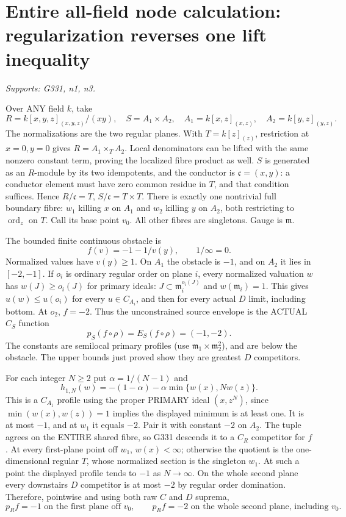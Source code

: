 \documentclass[11pt]{article}
\begin{document}
\section{Entire all-field node calculation: regularization reverses one lift inequality}
\textit{Supports: G331, n1, n3.}

Over ANY field $k$, take
\[
R=k[x,y,z]_{(x,y,z)}/(xy),\quad S=A_1\times A_2,
\quad A_1=k[x,z]_{(x,z)},\quad A_2=k[y,z]_{(y,z)}.
\]
The normalizations are the two regular planes. With $T=k[z]_{(z)}$, restriction at $x=0,y=0$ gives $R=A_1\times_T A_2$. Local denominators can be lifted with the same nonzero constant term, proving the localized fibre product as well. $S$ is generated as an $R$-module by its two idempotents, and the conductor is $\mathfrak c=(x,y)$: a conductor element must have zero common residue in $T$, and that condition suffices. Hence $R/\mathfrak c=T$, $S/\mathfrak c=T\times T$. There is exactly one nontrivial full boundary fibre: $w_1$ killing $x$ on $A_1$ and $w_2$ killing $y$ on $A_2$, both restricting to $\operatorname{ord}_z$ on $T$. Call its base point $v_0$. All other fibres are singletons. Gauge is $\mathfrak m$.

The bounded finite continuous obstacle is
\[
f(v)=-1-1/v(y),\qquad1/\infty=0.
\]
Normalized values have $v(y)\ge1$. On $A_1$ the obstacle is $-1$, and on $A_2$ it lies in $[-2,-1]$. If $o_i$ is ordinary regular order on plane $i$, every normalized valuation $w$ has $w(J)\ge o_i(J)$ for primary ideals: $J\subset\mathfrak m_i^{o_i(J)}$ and $w(\mathfrak m_i)=1$. This gives $u(w)\le u(o_i)$ for every $u\in C_{A_i}$, and then for every actual $D$ limit, including bottom. At $o_2$, $f=-2$. Thus the unconstrained source envelope is the ACTUAL $C_S$ function
\[
p_S(f\circ\rho)=E_S(f\circ\rho)=(-1,-2).              \tag{13}
\]
The constants are semilocal primary profiles (use $\mathfrak m_1\times\mathfrak m_2^2$), and are below the obstacle. The upper bounds just proved show they are greatest $D$ competitors.

For each integer $N\ge2$ put $\alpha=1/(N-1)$ and
\[
h_{1,N}(w)=-(1-\alpha)-\alpha\min\{w(x),Nw(z)\}.
\]
This is a $C_{A_1}$ profile using the proper PRIMARY ideal $(x,z^N)$, since $\min(w(x),w(z))=1$ implies the displayed minimum is at least one. It is at most $-1$, and at $w_1$ it equals $-2$. Pair it with constant $-2$ on $A_2$. The tuple agrees on the ENTIRE shared fibre, so G331 descends it to a $C_R$ competitor for $f$. At every first-plane point off $w_1$, $w(x)<\infty$; otherwise the quotient is the one-dimensional regular $T$, whose normalized section is the singleton $w_1$. At such a point the displayed profile tends to $-1$ as $N\to\infty$. On the whole second plane every downstairs $D$ competitor is at most $-2$ by regular order domination. Therefore, pointwise and using both raw $C$ and $D$ suprema,
\[
p_R f=-1\text{ on the first plane off }v_0,
\qquad p_R f=-2\text{ on the whole second plane, including }v_0. \tag{14}
\]
\end{document}
